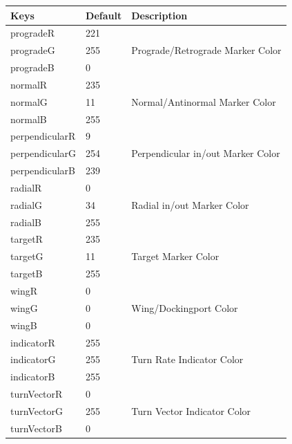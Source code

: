 \documentclass[paper=a4, 11 pt]{report}
\begin{document}
\renewcommand{\arraystretch}{1}
\begin{center}
\begin{tabular}{ |l  l  l| }
  \hline
  \textbf{Keys} & \textbf{Default} & \textbf{Description} \\ \hline
   progradeR & 221 & \multirow{3}{*}{Prograde/Retrograde Marker Color} \\
   progradeG & 255 &  \\
   progradeB & 0 &  \\ \hline
   normalR & 235 & \multirow{3}{*}{Normal/Antinormal Marker Color} \\
   normalG & 11 &  \\
   normalB & 255 &  \\ \hline
   perpendicularR & 9 & \multirow{3}{*}{Perpendicular in/out Marker Color} \\
   perpendicularG & 254 &  \\
   perpendicularB & 239 &  \\ \hline
   radialR & 0 & \multirow{3}{*}{Radial in/out Marker Color} \\
   radialG & 34 &  \\
   radialB & 255 &  \\ \hline
   targetR & 235 & \multirow{3}{*}{Target Marker Color} \\
   targetG & 11 &  \\
   targetB & 255 &  \\ \hline
   wingR & 0 & \multirow{3}{*}{Wing/Dockingport Color} \\
   wingG & 0 &  \\
   wingB & 0 &  \\ \hline
   indicatorR & 255 & \multirow{3}{*}{Turn Rate Indicator Color} \\
   indicatorG & 255 &  \\
   indicatorB & 255 &  \\ \hline
   turnVectorR & 0 & \multirow{3}{*}{Turn Vector Indicator Color} \\
   turnVectorG & 255 &  \\
   turnVectorB & 0 &  \\ \hline
\end{tabular}
\end{center}
\end{document}

